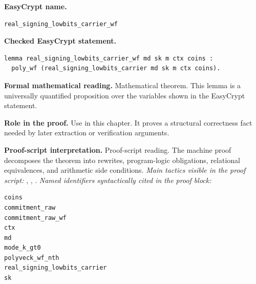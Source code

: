 \begin{formaltheorem}
\noindent\textbf{EasyCrypt name.}
\begin{lstlisting}[language=EasyCrypt,basicstyle=\ttfamily\scriptsize]
real_signing_lowbits_carrier_wf
\end{lstlisting}
\noindent\textbf{Checked EasyCrypt statement.}
\begin{lstlisting}[language=EasyCrypt,basicstyle=\ttfamily\scriptsize]
lemma real_signing_lowbits_carrier_wf md sk m ctx coins :
  poly_wf (real_signing_lowbits_carrier md sk m ctx coins).
\end{lstlisting}
\noindent\textbf{Formal mathematical reading.}
Mathematical theorem. This lemma is a universally quantified proposition over the variables shown in the EasyCrypt statement.

\noindent\textbf{Role in the proof.}
Use in this chapter. It proves a structural correctness fact needed by later extraction or verification arguments.

\noindent\textbf{Proof-script interpretation.}
Proof-script reading. The machine proof decomposes the theorem into rewrites, program-logic obligations, relational equivalences, and arithmetic side conditions.
\emph{Main tactics visible in the proof script:} , , .
\emph{Named identifiers syntactically cited in the proof block:}
\begin{lstlisting}[language=EasyCrypt,basicstyle=\ttfamily\scriptsize]
coins
commitment_raw
commitment_raw_wf
ctx
md
mode_k_gt0
polyveck_wf_nth
real_signing_lowbits_carrier
sk
\end{lstlisting}

\end{formaltheorem}

